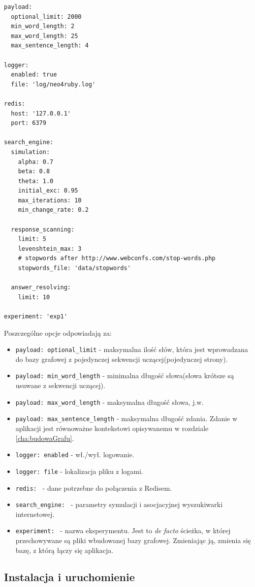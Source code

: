 \lstset{language=ruby}
\begin{lstlisting}[frame=single]
payload:
  optional_limit: 2000
  min_word_length: 2
  max_word_length: 25
  max_sentence_length: 4

logger:
  enabled: true
  file: 'log/neo4ruby.log'

redis:
  host: '127.0.0.1'
  port: 6379

search_engine:
  simulation:
    alpha: 0.7
    beta: 0.8
    theta: 1.0
    initial_exc: 0.95
    max_iterations: 10
    min_change_rate: 0.2

  response_scanning:
    limit: 5
    levenshtein_max: 3
    # stopwords after http://www.webconfs.com/stop-words.php
    stopwords_file: 'data/stopwords'

  answer_resolving:
    limit: 10

experiment: 'exp1'

\end{lstlisting}
Poszczególne opcje odpowiadają za:
\begin{itemize}
\item \texttt{payload: optional\_limit} -  maksymalna ilość słów, która jest wprowadzana do bazy grafowej z pojedynczej sekwencji uczącej(pojedynczej strony).
\item \texttt{payload: min\_word\_length} - minimalna długość słowa(słowa krótsze są usuwane z sekwencji uczącej).
\item \texttt{payload: max\_word\_length} - maksymalna długość słowa, j.w.
\item \texttt{payload: max\_sentence\_length} - maksymalna długość zdania. Zdanie w aplikacji jest równoważne kontekstowi opisywanemu w rozdziale \ref{cha:budowaGrafu}.
\item \texttt{logger: enabled} - wł./wył. logowanie.
\item \texttt{logger: file} - lokalizacja pliku z logami.
\item \texttt{redis: } - dane potrzebne do połączenia z Redisem.
\item \texttt{search\_engine: } - parametry symulacji i asocjacyjnej wyszukiwarki internetowej.
\item \texttt{experiment: } - nazwa eksperymentu. Jest to \emph{de facto} ścieżka, w której przechowywane są pliki wbudowanej bazy grafowej. Zmieniając ją, zmienia się
bazę, z którą łączy się aplikacja.
\end{itemize}

\subsection{Instalacja i uruchomienie}
\label{subs:instalacjaMri}


